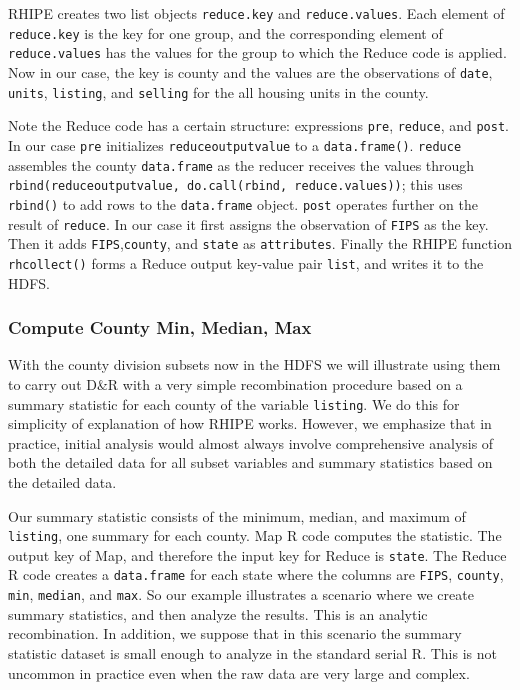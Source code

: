 RHIPE creates two list objects \texttt{reduce.key} and \texttt{reduce.values}.
Each element of \texttt{reduce.key} is the key for one group, and the corresponding
element of \texttt{reduce.values} has the values for the group to which the Reduce
code is applied.  Now in our case, the key is county and the values are the
observations of  \texttt{date}, \texttt{units}, \texttt{listing}, and \texttt{selling} 
for the all housing units in the county.

Note the Reduce code has a certain structure: expressions \texttt{pre}, \texttt{reduce},
and \texttt{post}. In our case \texttt{pre} initializes \texttt{reduceoutputvalue} to a
\texttt{data.frame()}. \texttt{reduce} assembles the county \texttt{data.frame} as the
reducer receives the values through \texttt{rbind(reduceoutputvalue, do.call(rbind,
reduce.values))}; this uses \texttt{rbind()} to add rows to the \texttt{data.frame} object.
\texttt{post} operates further on the result of \texttt{reduce}. In our case it first assigns
the observation of \texttt{FIPS} as the key. Then it adds \texttt{FIPS},\texttt{county}, and
\texttt{state} as \texttt{attributes}. Finally the RHIPE function
\texttt{rhcollect()} forms a Reduce output key-value pair \texttt{list}, and writes it to the
HDFS.

\subsubsection{Compute County Min, Median, Max}

With the county division subsets now in the HDFS we will illustrate using them
to carry out D\&R with a very simple recombination procedure based on a
summary statistic for each county of the variable \texttt{listing}.
We do this for simplicity of explanation of how RHIPE works.
However, we emphasize that in practice, initial analysis would
almost always involve comprehensive analysis of both the detailed data for all
subset variables and summary statistics based on the detailed data.

Our summary statistic consists of the minimum, median, and maximum of
\texttt{listing}, one summary for each county. Map R code computes the statistic.
The output key of Map, and therefore the input key for Reduce is \texttt{state}.
The Reduce R code creates a \texttt{data.frame} for each state
where the columns are \texttt{FIPS}, \texttt{county}, \texttt{min}, \texttt{median}, and \texttt{max}.
So our example illustrates a scenario where we create summary statistics, and
then analyze the results. This is an analytic recombination. In addition, we
suppose that in this scenario the summary statistic dataset is small enough to
analyze in the standard serial R. This is not uncommon in practice even when
the raw data are very large and complex.


